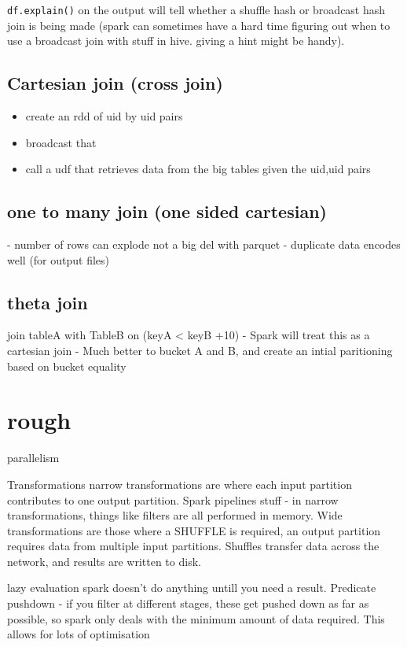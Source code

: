 \documentclass{article}
\begin{document}
    \verb|df.explain()| on the output will tell whether a shuffle hash or broadcast hash join is being made
    (spark can sometimes have a hard time figuring out when to use a broadcast join with stuff in hive. giving a hint might be handy).

\subsection{Cartesian join (cross join)}
\begin{itemize}
\item create an rdd of uid by uid pairs
\item broadcast that
\item call a udf that retrieves data from the big tables given the uid,uid pairs
\end{itemize}

\subsection{one to many join (one sided cartesian)}
- number of rows can explode
not a big del with parquet - duplicate data encodes well (for output files)

\subsection{theta join}
join tableA with TableB on (keyA < keyB +10)
  - Spark will treat this as a cartesian join
  - Much better to bucket A and B, and create an intial paritioning based on bucket equality

\section{rough}

parallelism 

Transformations
narrow transformations are where each input partition contributes to one output partition.
Spark pipelines stuff - in narrow transformations, things like filters are all performed in memory.
Wide transformations are those where a SHUFFLE is required, an output partition requires data from multiple input partitions.
Shuffles transfer data across the network, and results are written to disk.

lazy evaluation
spark doesn't do anything untill you need a result. Predicate pushdown - if you filter at different stages, these get pushed down as far as possible, so spark only deals with the minimum amount of data required. This allows for lots of optimisation
\end{document}

